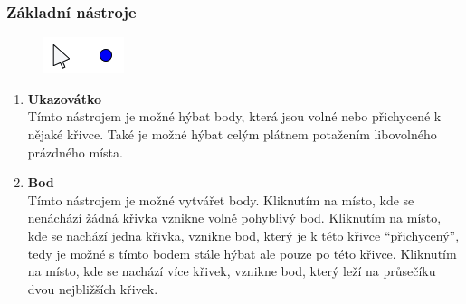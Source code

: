 \documentclass[11pt]{article}
\begin{document}
    \subsubsection{Základní nástroje}
    \vspace{-10pt}
    \begin{figure}[h]
        \begin{center}
        \includegraphics[scale=0.5]{imgs/basic_tools.png}
        \end{center}
    \end{figure}
    \vspace{-25pt}
    \begin{enumerate}
        \item{\bf Ukazovátko} \\
        Tímto nástrojem je možné hýbat body, která jsou volné nebo přichycené k nějaké křivce. Také je možné hýbat celým plátnem potažením libovolného prázdného místa.
        \item{\bf Bod} \label{point}\\
        Tímto nástrojem je možné vytvářet body. Kliknutím na místo, kde se nenáchází žádná křivka vznikne volně pohyblivý bod. Kliknutím na místo, kde se nachází jedna křivka, vznikne bod, který je k této křivce \enquote{přichycený}, tedy je možné s tímto bodem stále hýbat ale pouze po této křivce. Kliknutím na místo, kde se nachází více křivek, vznikne bod, který leží na průsečíku dvou nejbližších křivek.
    \end{enumerate}
\end{document}
